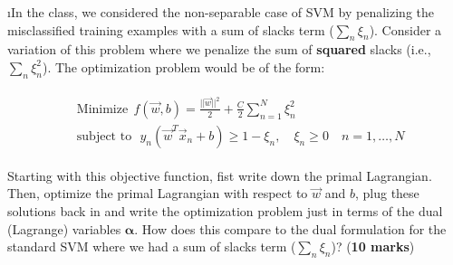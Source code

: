 \documentclass[fleqn]{article}
\begin{document}
\i In the class, we considered the non-separable case of SVM by penalizing
the misclassified training examples with a sum of slacks term ($\sum_n \xi_n$).
Consider a variation of this problem where we penalize the sum of \textbf{squared} 
slacks (i.e., $\sum_n \xi_n^2$). The optimization problem would be of the form:

\begin{gather}
\begin{split}
&   	\text{Minimize} \ \ f(\vec{w},b) = \frac{||\vec{w}||^2}{2} + \frac{C}{2} \sum_{n=1}^N \xi_n^2 \nonumber 
\\
&    	\text{subject to}\ \ \  y_n(\vec{w}^T\vec{x}_n + b) \geq 1 - \xi_n,\quad \xi_n \geq 0 \quad n=1,\ldots,N \nonumber
\end{split}
\end{gather}

Starting with this objective function, fist write down the primal Lagrangian. Then, 
optimize the primal Lagrangian with respect to $\vec{w}$ and $b$, plug these 
solutions back in and write the optimization problem just in terms of the dual 
(Lagrange) variables $\boldsymbol{\alpha}$. How does this compare to the dual formulation 
for the standard SVM where we had a sum of slacks term ($\sum_n \xi_n$)? (\textbf{10 marks})
\end{document}
